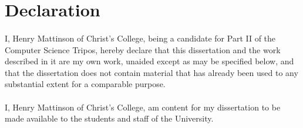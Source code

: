 \section*{Declaration}

\paragraph{} I, Henry Mattinson of Christ's College, being a candidate for Part II of the Computer Science Tripos,
hereby declare that this dissertation and the work described in it
are my own work, unaided except as may be specified below, and
that the dissertation does not contain material that has already
been used to any substantial extent for a comparable purpose.

\paragraph{} I, Henry Mattinson of Christ's College,
am content for my dissertation to be made available to the students and staff of the University.

\bigskip
{}

\medskip
{}

%
%
%

